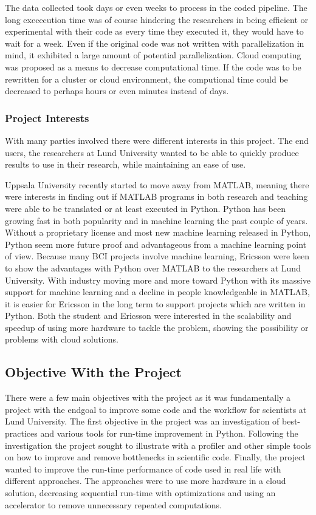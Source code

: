 \documentclass[12pt, a4paper]{article}
\begin{document}
The data collected took days or even weeks to process in the coded pipeline.
The long exececution time was of course hindering the researchers in being efficient or experimental with their code as every time they executed it, they would have to wait for a week.
Even if the original code was not written with parallelization in mind, it exhibited a large amount of potential parallelization.
Cloud computing was proposed as a means to decrease computational time.
If the code was to be rewritten for a cluster or cloud environment, the computional time could be decreased to perhaps hours or even minutes instead of days.

\subsubsection{Project Interests}

With many parties involved there were different interests in this project.
The end users, the researchers at Lund University wanted to be able to quickly produce results to use in their research, while maintaining an ease of use.

Uppsala University recently started to move away from MATLAB, meaning there were interests in finding out if MATLAB programs in both research and teaching were able to be translated or at least executed in Python.
Python has been growing fast in both popularity and in machine learning the past couple of years.
Without a proprietary license and most new machine learning released in Python, Python seem more future proof and advantageous from a machine learning point of view.
Because many BCI projects involve machine learning, Ericsson were keen to show the advantages with Python over MATLAB to the researchers at Lund University.
With industry moving more and more toward Python with its massive support for machine learning and a decline in people knowledgeable in MATLAB, it is easier for Ericsson in the long term to support projects which are written in Python.
Both the student and Ericsson were interested in the scalability and speedup of using more hardware to tackle the problem, showing the possibility or problems with cloud solutions.

\subsection{Objective With the Project}%

There were a few main objectives with the project as it was fundamentally a project with the endgoal to improve some code and the workflow for scientists at Lund University.
The first objective in the project was an investigation of best-practices and various tools for run-time improvement in Python.
Following the investigation the project sought to illustrate with a profiler and other simple tools on how to improve and remove bottlenecks in scientific code.
Finally, the project wanted to improve the run-time performance of code used in real life with different approaches.
The approaches were to use more hardware in a cloud solution, decreasing sequential run-time with optimizations and using an accelerator to remove unnecessary repeated computations.
\end{document}

